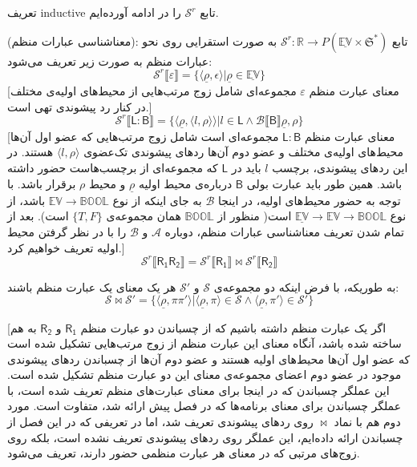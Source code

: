 تعریف \gls*{inductive} تابع 
$\mathcal{S}^r$
را در ادامه آورده‌ایم.
\begin{defn}
	(معناشناسی عبارات منظم):
	تابع 
	$\mathcal{S}^r:\mathbb{R}\rightarrow \mathit{P}(\mathbb{\underline{EV}\times \mathfrak{S}}^*)$
	به صورت استقرایی روی نحو عبارات منظم به صورت زیر تعریف می‌شود:
$$\mathcal{S}^r\llbracket\varepsilon\rrbracket= \{ \langle \underline{\rho} , \epsilon \rangle | \underline{\rho} \in \underline{\mathbb{EV}}\}$$
[معنای عبارت منظم
$\varepsilon$
مجموعه‌ای شامل زوج مرتب‌هایی از محیط‌های اولیه‌ی مختلف در کنار رد پیشوندی تهی است.]
$$\mathcal{S}^r\llbracket\mathsf{L:B}\rrbracket = \{\langle\underline{\rho},\langle l , \rho \rangle \rangle | l \in \mathsf{L} \land \mathcal{B}\llbracket\mathsf{B}\rrbracket \underline{\rho},\rho \}$$
[معنای عبارت منظم
$\mathsf{L:B}$
مجموعه‌ای است شامل زوج مرتب‌هایی که عضو اول آن‌ها محیط‌های اولیه‌ی مختلف و عضو دوم آن‌ها ردهای پیشوندی تک‌عضوی 
$\langle l , \rho \rangle$
هستند. در این ردهای پیشوندی، برچسب 
$l$
باید در
$\mathsf{L}$
که مجموعه‌ای از برچسب‌هاست حضور داشته باشد. همین طور باید عبارت بولی 
$\mathsf{B}$
درباره‌ی محیط اولیه
$\underline{\rho}$
و محیط 
$\rho$
برقرار باشد. با توجه به حضور محیط‌های اولیه، در اینجا
$\mathcal{B}$
به جای اینکه از نوع 
$\mathbb{EV} \rightarrow \mathbb{BOOL}$
باشد، از نوع
$\underline{\mathbb{EV}} \rightarrow \mathbb{EV} \rightarrow \mathbb{BOOL}$
است( منظور از 
$\mathbb{BOOL}$
همان مجموعه‌ی 
$\{\mathit{T,F}\}$
است). بعد از تمام شدن تعریف معناشناسی عبارات منظم، دوباره
$\mathcal{A}$
و 
$\mathcal{B}$
را با در نظر گرفتن محیط اولیه تعریف خواهیم کرد.]
$$\mathcal{S}^r\llbracket\mathsf{R_1 R_2}\rrbracket= \mathcal{S}^r\llbracket\mathsf{R_1}\rrbracket \Join \mathcal{S}^r\llbracket\mathsf{R_2}\rrbracket$$
\begin{center}
	به ‌طوریکه، با فرض اینکه دو مجموعه‌ی 
	$\mathcal{S}$
	و
	$\mathcal{S'}$
	هر یک معنای یک عبارت منظم باشند:
$$\mathcal{S \Join S'}=
\{
\langle \underline{\rho}, \pi \pi' \rangle |
\langle \underline{\rho},\pi \rangle \in \mathcal{S} \land
\langle \underline{\rho},\pi' \rangle \in \mathcal{S'}
\}
$$
\end{center}
[اگر یک عبارت منظم داشته باشیم که از چسباندن دو عبارت منظم
$\mathsf{R_1}$
و 
$\mathsf{R_2}$
به هم ساخته شده باشد، آنگاه معنای این عبارت منظم از زوج مرتب‌هایی تشکیل شده است که عضو اول آن‌ها محیط‌های اولیه هستند و عضو دوم آن‌ها از چسباندن ردهای پیشوندی موجود در عضو دوم اعضای مجموعه‌ی معنای این دو عبارت منظم تشکیل شده است. این عملگر چسباندن که در اینجا برای معنای عبارت‌های منظم تعریف شده است، با عملگر چسباندن برای معنای برنامه‌ها که در فصل پیش ارائه شد، متفاوت است. مورد دوم هم با نماد $\Join$ روی ردهای پیشوندی تعریف ‌شد، اما در تعریفی که در این فصل از چسباندن ارائه داده‌ایم، این عملگر روی ردهای پیشوندی تعریف نشده است، بلکه روی زوج‌های مرتبی که در معنای هر عبارت منظمی حضور دارند، تعریف می‌شود.


\end{defn}
